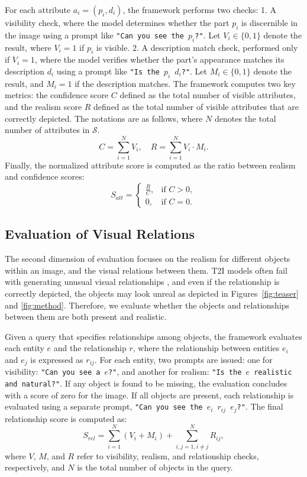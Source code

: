 For each attribute $a_i = (p_i, d_i)$, the framework performs two checks:
1. A visibility check, where the model determines whether the part $p_i$ is discernible in the image using a prompt like \texttt{"Can you see the $p_i$?"}. Let $V_i \in \{0, 1\}$ denote the result, where $V_i = 1$ if $p_i$ is visible.
2. A description match check, performed only if $V_i = 1$, where the model verifies whether the part's appearance matches its description $d_i$ using a prompt like \texttt{"Is the $p_i$ $d_i$?"}. Let $M_i \in \{0, 1\}$ denote the result, and $M_i = 1$ if the description matches. The framework computes two key metrics: the confidence score $C$ defined as the total number of visible attributes, and the realism score $R$ defined as the total number of visible attributes that are correctly depicted. The notations are as follows, where $N$ denotes the total number of attributes in $\mathcal{S}$. \\
\[
C = \sum_{i=1}^N V_i, \quad R = \sum_{i=1}^N V_i \cdot M_i.
\]
Finally, the normalized attribute score is computed as the ratio between realism and confidence scores:
\[
S_{att} = \begin{cases} 
\frac{R}{C}, & \text{if } C > 0, \\
0, & \text{if } C = 0.
\end{cases}
\]

\subsection{Evaluation of Visual Relations}
The second dimension of evaluation focuses on the realism for different objects within an image, and the visual relations between them. T2I models often fail with generating unusual visual relationships \cite{gokhale2022benchmarking}, and even if the relationship is correctly depicted, the objects may look unreal as depicted in Figures~\ref{fig:teaser} and \ref{fig:method}. Therefore, we evaluate whether the objects and  relationships between them are both present and realistic.

Given a query that specifies relationships among objects, the framework evaluates each entity $e$ and the relationship $r$, where the relationship between entities $e_i$ and $e_j$ is expressed as $r_{ij}$. For each entity, two prompts are issued: one for visibility: \texttt{"Can you see a $e$?"}, and another for realism: \texttt{"Is the $e$ realistic and natural?"}. If any object is found to be missing, the evaluation concludes with a score of zero for the image. If all objects are present, each relationship is evaluated using a separate prompt, \texttt{"Can you see the $e_i$ $r_{ij}$ $e_j$?"}. The final relationship score is computed as:
\[
S_{rel} = \sum_{i=1}^N (V_i + M_i) + \sum_{i,j=1, i\neq j}^N{R_{ij}},
\]
where $V$, $M$, and $R$ refer to visibility, realism, and relationship checks, respectively, and $N$ is the total number of objects in the query.

